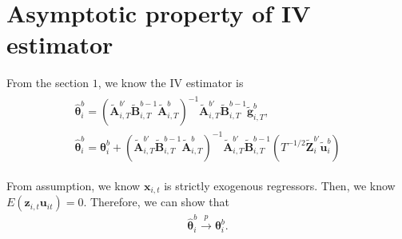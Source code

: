 \documentclass[12pt,a4paper,hyperref]{article}
\begin{document}
\section{Asymptotic property of IV estimator}

From the section $1$, we know the IV estimator is
\begin{align}
\begin{split}
\boldsymbol{\hat{\theta}}^{b}_{i}=\left(\tilde{\boldsymbol{A}}_{i,T}^{b'}\tilde{\boldsymbol{B}}_{i,T}^{b -1}\tilde{\boldsymbol{A}}^{b}_{i,T} \right)^{-1}\tilde{\boldsymbol{A}}_{i,T}^{b'}\tilde{\boldsymbol{B}}_{i,T}^{b -1}\tilde{\boldsymbol{g}}^{b}_{i,T}, \\
\boldsymbol{\hat{\theta}}^{b}_{i}=\boldsymbol{\theta}^{b}_{i}+\left(\tilde{\boldsymbol{A}}_{i,T}^{b'}\tilde{\boldsymbol{B}}_{i,T}^{b -1}\tilde{\boldsymbol{A}}^{b}_{i,T} \right)^{-1}\tilde{\boldsymbol{A}}_{i,T}^{b'}\tilde{\boldsymbol{B}}_{i,T}^{b -1}\left(T^{-1/2}  \tilde{\boldsymbol{Z}}^{b'}_{i}\tilde{\boldsymbol{u}}^{b}_{i} \right)
\end{split}
\end{align}

From assumption, we know $\boldsymbol{x}_{i,t}$ is strictly exogenous regressors. Then, we know $ E\left(\boldsymbol{z}_{i,t} \boldsymbol{u}_{it}  \right)=0.$
Therefore, we can show that
\begin{align}
\boldsymbol{\hat{\theta}}^{b}_{i}\overset{p}{\to} \boldsymbol{\theta}^{b}_{i}.
\end{align}








\renewcommand\refname{References}


\end{document}
